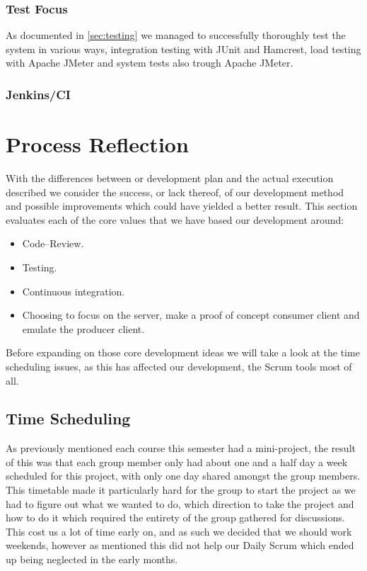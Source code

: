 \subsubsection{Test Focus}
As documented in \cref{sec:testing} we managed to successfully thoroughly test the system in various ways, integration testing with JUnit and Hamcrest, load testing with Apache JMeter and system tests also trough Apache JMeter.
\subsubsection{Jenkins/CI}
\section{Process Reflection}
With the differences between or development plan and the actual execution described we consider the success, or lack thereof, of our development method and possible improvements which could have yielded a better result.
This section evaluates each of the core values that we have based our development around:
\begin{itemize}
    \item Code--Review.
    \item Testing.
    \item Continuous integration.
    \item Choosing to focus on the server, make a proof of concept consumer client and emulate the producer client.
\end{itemize}
Before expanding on those core development ideas we will take a look at the time scheduling issues, as this has affected our development, the Scrum tools most of all.
\subsection{Time Scheduling}\label{sub:time_scheduling}
As previously mentioned each course this semester had a mini-project, the result of this was that each group member only had about one and a half day a week scheduled for this project, with only one day shared amongst the group members.
This timetable made it particularly hard for the group to start the project as we had to figure out what we wanted to do, which direction to take the project and how to do it which required the entirety of the group gathered for discussions.
This cost us a lot of time early on, and as such we decided that we should work weekends, however as mentioned this did not help our Daily Scrum which ended up being neglected in the early months.

